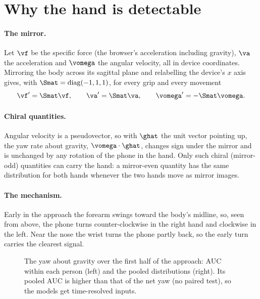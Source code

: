 \section{Why the hand is detectable}\label{sec:physics}

\paragraph{The mirror.} Let $\vf$ be the specific force (the browser's acceleration including gravity), $\va$ the
acceleration and $\vomega$ the angular velocity, all in device coordinates. Mirroring the body across its sagittal
plane and relabelling the device's $x$ axis gives, with $\Smat = \operatorname{diag}(-1, 1, 1)$, for every grip and
every movement
\begin{equation}
  \vf' = \Smat\vf, \qquad \va' = \Smat\va, \qquad \vomega' = -\Smat\vomega .
  \label{eq:mirror}
\end{equation}

\paragraph{Chiral quantities.} Angular velocity is a pseudovector, so with $\ghat$ the unit vector pointing up, the
yaw rate about gravity, $\vomega\cdot\ghat$, changes sign under the mirror and is unchanged by any rotation of the
phone in the hand. Only such chiral (mirror-odd) quantities can carry the hand: a mirror-even quantity has the same
distribution for both hands whenever the two hands move as mirror images.

\paragraph{The mechanism.} Early in the approach the forearm swings toward the body's midline, so, seen from above,
the phone turns counter-clockwise in the right hand and clockwise in the left. Near the nose the wrist turns the
phone partly back, so the early turn carries the clearest signal.

\begin{figure}[htbp]
\centering
{}
\caption{The yaw about gravity over the first half of the approach: AUC within each person (left) and the pooled
distributions (right). Its pooled AUC is higher than that of the net yaw (no paired test), so the models get
time-resolved inputs.}
\label{fig:S2_13_first_half_yaw}
\end{figure}

